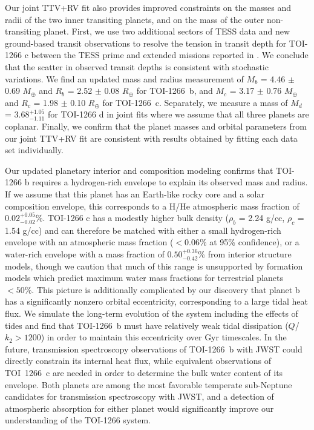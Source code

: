 \documentclass[twocolumn]{aastex631}
\begin{document}
Our joint TTV+RV fit also provides improved constraints on the masses and radii of the two inner transiting planets, and on the mass of the outer non-transiting planet. First, we use two additional sectors of TESS data and new ground-based transit observations to resolve the tension in transit depth for TOI-1266 c between the TESS prime and extended missions reported in \cite{Cloutier_2024}. We conclude that the scatter in observed transit depths is consistent with stochastic variations. We find an updated mass and radius measurement of $M_b$ = 4.46 $\pm$ 0.69 $M_{\oplus}$ and $R_b$ = 2.52 $\pm$ 0.08 $R_{\oplus}$ for TOI-1266~b, and $M_c$ = 3.17 $\pm$ 0.76 $M_{\oplus}$ and $R_c$ = 1.98 $\pm$ 0.10 $R_{\oplus}$ for TOI-1266~c. Separately, we measure a mass of $M_d$ = 3.68$^{+1.05}_{-1.11}$ for TOI-1266 d in joint fits where we assume that all three planets are coplanar. Finally, we confirm that the planet masses and orbital parameters from our joint TTV+RV fit are consistent with results obtained by fitting each data set individually.

Our updated planetary interior and composition modeling confirms that TOI-1266 b requires a hydrogen-rich envelope to explain its observed mass and radius. If we assume that this planet has an Earth-like rocky core and a solar composition envelope, this corresponds to a H/He atmospheric mass fraction of $0.02^{+0.05}_{-0.02}$\%. TOI-1266 c has a modestly higher bulk density ($\rho_b$ = 2.24 g/cc, $\rho_c$ = 1.54 g/cc) and can therefore be matched with either a small hydrogen-rich envelope with an atmospheric mass fraction ($< 0.06 \%$ at 95\% confidence), or a water-rich envelope with a mass fraction of $0.50^{+0.36}_{-0.42}$\% from interior structure models, though we caution that much of this range is unsupported by formation models which predict maximum water mass fractions for terrestrial planets $< 50\%$. This picture is additionally complicated by our discovery that planet b has a significantly nonzero orbital eccentricity, corresponding to a large tidal heat flux. We simulate the long-term evolution of the system including the effects of tides and find that TOI-1266~b must have relatively weak tidal dissipation ($Q$/$k_2>1200$) in order to maintain this eccentricity over Gyr timescales. In the future, transmission spectroscopy observations of TOI-1266~b with JWST could directly constrain its internal heat flux, while equivalent observations of TOI~1266~c are needed in order to determine the bulk water content of its envelope.
Both planets are among the most favorable temperate sub-Neptune candidates for transmission spectroscopy with JWST, and a detection of atmospheric absorption for either planet would significantly improve our understanding of the TOI-1266 system. 
\end{document}

